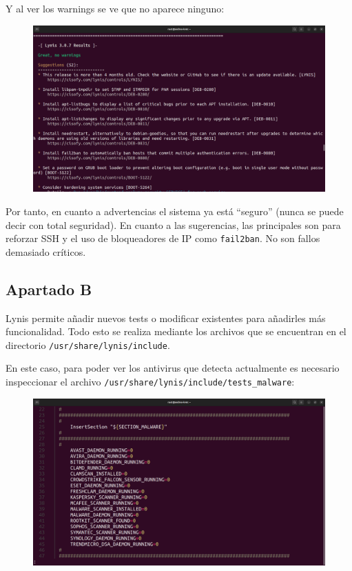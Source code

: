 \documentclass{article}
\begin{document}
Y al ver los warnings se ve que no aparece ninguno:

\begin{figure}[H]
    \includegraphics[width=\textwidth]{imagenes/lyniswarnings2.png}
\end{figure}

Por tanto, en cuanto a advertencias el sistema ya está ``seguro'' (nunca se puede decir con total seguridad). En cuanto a las sugerencias, las principales son para reforzar SSH y el uso de bloqueadores de IP como \verb|fail2ban|. No son fallos demasiado críticos.

\subsection*{Apartado B}
Lynis permite añadir nuevos tests o modificar existentes para añadirles más funcionalidad. Todo esto se realiza mediante los archivos que se encuentran en el directorio \verb|/usr/share/lynis/include|.

En este caso, para poder ver los antivirus que detecta actualmente es necesario inspeccionar el archivo \verb|/usr/share/lynis/include/tests_malware|:

\begin{figure}[H]
    \includegraphics[width=\textwidth]{imagenes/antivirus1.png}
\end{figure}
\end{document}
